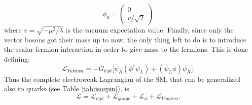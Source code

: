 \begin{equation}\label{eq:vacuum}
\phi_{0} = \begin{pmatrix} 0 \\ v/\sqrt{2}
\end{pmatrix}
\end{equation}
where $v = \sqrt{-\mu^{2}/\lambda}$ is 
the vacuum expectation value. Finally, since
only the vector bosons got their mass up to now,
the only thing left to do is to introduce 
the scalar-fermion interaction in order to give
mass to the fermions. This is done defining:
\begin{equation}\label{eq:lagYukawa}
\mathcal{L}_{Yukawa} = -G_{lept}\big[\bar\psi_{R}(\phi^{\dag}\psi_{L}) + (\bar\psi_{L}\phi)\psi_{R}\big] .
\end{equation}Thus the complete electroweak Lagrangian of the SM, that can be generalized also to quarks (see Table \ref{tab:isospin}), is\begin{equation}\label{eq:lagSM}
\mathcal{L}= \mathcal{L}_{lept} +\mathcal{L}_{gauge} +\mathcal{L}_{\phi} +\mathcal{L}_{Yukawa}.
\end{equation}


